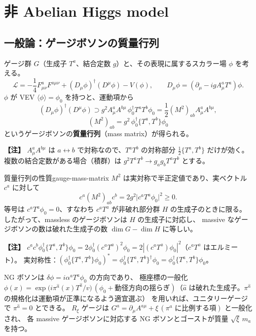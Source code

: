 \documentclass[uplatex,dvipdfmx,a4paper,11pt,openany]{jsbook}
\newcommand{\term}[2]{\textbf{#1}（#2）}
\newenvironment{note}{\vspace{1ex}\par\footnotesize\noindent\textbf{【注】}}{\par\vspace{1ex}}
\numberwithin{equation}{chapter}
\theoremstyle{definition}
\theoremstyle{plain}
\theoremstyle{remark}
\newcommand{\Lag}{\mathcal{L}}
\begin{document}
\section{非 Abelian Higgs model}
\label{sec:nonabelian-higgs}
\subsection{一般論：ゲージボソンの質量行列}
ゲージ群 $G$（生成子 $T^a$、結合定数 $g$）と、その表現に属するスカラー場 $\phi$ を考える。
\begin{equation}
\Lag=-\frac14F^a_{\mu\nu}F^{a\mu\nu}+(D_\mu\phi)^\dagger(D^\mu\phi)-V(\phi),\qquad
D_\mu\phi=(\partial_\mu-igA^a_\mu T^a)\phi .
\end{equation}
$\phi$ が VEV $\langle\phi\rangle=\phi_0$ を持つと、運動項から
\begin{equation}
(D_\mu\phi)^\dagger(D^\mu\phi)\supset g^2A^a_\mu A^{b\mu}\,\phi_0^\dagger T^aT^b\phi_0
=\frac12(M^2)_{ab}A^a_\mu A^{b\mu},
\end{equation}
\begin{equation}
(M^2)_{ab}=g^2\,\phi_0^\dagger\{T^a,T^b\}\phi_0
\label{eq:gauge-mass-matrix}
\end{equation}
というゲージボソンの\term{質量行列}{mass matrix}が得られる。
\begin{note}
$A^a_\mu A^{b\mu}$ は $a\leftrightarrow b$ で対称なので、$T^aT^b$ の対称部分 $\frac12\{T^a,T^b\}$ だけが効く。
複数の結合定数がある場合（積群）は $g^2T^aT^b\to g_ag_bT^aT^b$ とする。
\end{note}
\begin{myprop}{質量行列の性質}{gauge-mass-matrix}
$M^2$ は実対称で半正定値であり、実ベクトル $c^a$ に対して
\begin{equation}
c^a(M^2)_{ab}c^b=2g^2\bigl|c^aT^a\phi_0\bigr|^2\ge0 .
\end{equation}
等号は $c^aT^a\phi_0=0$、すなわち $c^aT^a$ が非破れ部分群 $H$ の生成子のときに限る。
したがって、massless のゲージボソンは $H$ の生成子に対応し、
massive なゲージボソンの数は破れた生成子の数 $\dim G-\dim H$ に等しい。
\end{myprop}
\begin{note}
$c^ac^b\phi_0^\dagger\{T^a,T^b\}\phi_0=2\phi_0^\dagger(c^aT^a)^2\phi_0=2|(c^aT^a)\phi_0|^2$（$c^aT^a$ はエルミート）。
実対称性：$(\phi_0^\dagger\{T^a,T^b\}\phi_0)^*=\phi_0^\dagger\{T^a,T^b\}^\dagger\phi_0=\phi_0^\dagger\{T^a,T^b\}\phi_0$。
\end{note}
NG ボソンは $\delta\phi=i\alpha^aT^a\phi_0$ の方向であり、
極座標の一般化 $\phi(x)=\exp\bigl(i\pi^{\hat a}(x)T^{\hat a}/v\bigr)\,(\phi_0+\text{動径方向の揺らぎ})$（$\hat a$ は破れた生成子。$\pi^{\hat a}$ の規格化は運動項が正準になるよう適宜選ぶ）
を用いれば、ユニタリーゲージで $\pi^{\hat a}=0$ とできる。
$R_\xi$ ゲージは $G^a=\partial_\mu A^{a\mu}+\xi\,(\text{$\pi^a$ に比例する項})$ と一般化され、
各 massive ゲージボソンに対応する NG ボソンとゴーストが質量 $\sqrt\xi\,m_a$ を持つ。
\end{document}
